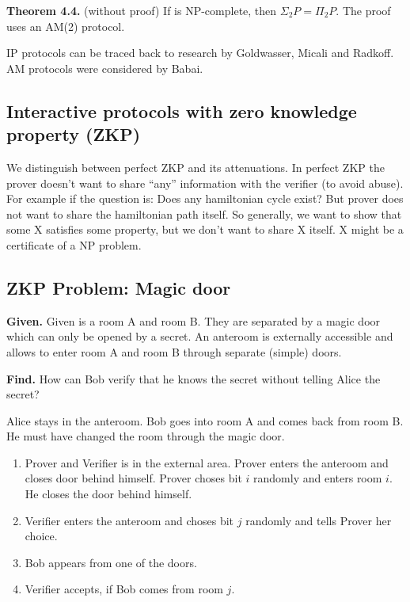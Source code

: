 \documentclass[a4paper]{article}
\newcommand{\given}[1]{\textbf{Given.} #1\par}
\newcommand{\find}[1]{\textbf{Find.} #1\par}
\newcommand{\cls}[1]{\rm{#1}}
\newcommand{\probl}[1]{\text{\textsc{#1}}}
\newenvironment{spec}[0]{\begin{framed}}{\end{framed}}
\begin{document}
\textbf{Theorem 4.4.} (without proof)
  If \probl{GI} is \cls{NP}-complete, then $\Sigma_2 P = \Pi_2 P$.
  The proof uses an AM(2) protocol.

\cls{IP} protocols can be traced back to research by Goldwasser, Micali and Radkoff.
\cls{AM} protocols were considered by Babai.

\subsection{Interactive protocols with zero knowledge property (ZKP)}
\label{sec:4.3}
%
We distinguish between perfect ZKP and its attenuations. In perfect ZKP the prover
doesn't want to share ``any'' information with the verifier (to avoid abuse).
For example if the question is: Does any hamiltonian cycle exist? But prover
does not want to share the hamiltonian path itself. So generally, we want to
show that some X satisfies some property, but we don't want to share X itself.
X might be a certificate of a \cls{NP} problem.

\subsection{ZKP Problem: Magic door}
%
\begin{spec}
  \given{Given is a room A and room B. They are separated by a magic door
    which can only be opened by a secret. An anteroom is externally accessible and
    allows to enter room A and room B through separate (simple) doors.}
  \find{How can Bob verify that he knows the secret without telling Alice the secret?}
\end{spec}

Alice stays in the anteroom. Bob goes into room A and comes back from room B.
He must have changed the room through the magic door.

\begin{enumerate}
  \item Prover and Verifier is in the external area.
        Prover enters the anteroom and closes door behind himself.
        Prover choses bit $i$ randomly and enters room $i$. He closes
        the door behind himself.
  \item Verifier enters the anteroom and choses bit $j$ randomly
        and tells Prover her choice.
  \item Bob appears from one of the doors.
  \item Verifier accepts, if Bob comes from room $j$.
\end{enumerate}
\end{document}
